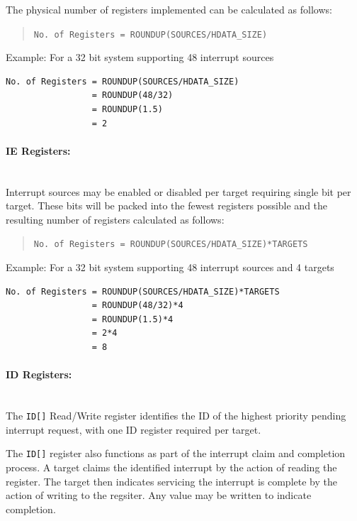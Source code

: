 The physical number of registers implemented can be calculated as follows:

\begin{quote}
\texttt{No.\ of\ Registers\ =\ ROUNDUP(SOURCES/HDATA\_SIZE)}
\end{quote}

Example: For a 32 bit system supporting 48 interrupt sources

\begin{verbatim}
No. of Registers = ROUNDUP(SOURCES/HDATA_SIZE)   
                 = ROUNDUP(48/32)
                 = ROUNDUP(1.5)
                 = 2
\end{verbatim}

\paragraph{IE Registers:} ~\\

Interrupt sources may be enabled or disabled per target requiring single bit per target.
These bits will be packed into the fewest registers possible and the resulting number of registers calculated as follows:

\begin{quote}
\texttt{No.\ of\ Registers\ =\ ROUNDUP(SOURCES/HDATA\_SIZE)*TARGETS}
\end{quote}

Example: For a 32 bit system supporting 48 interrupt sources and 4 targets

\begin{verbatim}
No. of Registers = ROUNDUP(SOURCES/HDATA_SIZE)*TARGETS
                 = ROUNDUP(48/32)*4
                 = ROUNDUP(1.5)*4
                 = 2*4
                 = 8
\end{verbatim}

\paragraph{ID Registers:} ~\\

The \texttt{ID[]} Read/Write register identifies the ID of the highest priority pending interrupt request, with one ID register required per target.

The \texttt{ID[]} register also functions as part of the interrupt claim and completion process. A target claims the identified interrupt by the action of reading the register. The target then indicates servicing the interrupt is complete by the action of writing to the regsiter. Any value may be written to indicate completion.

